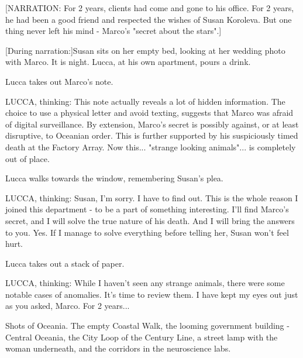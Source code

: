 \documentclass[11pt]{article}
\begin{document}
[NARRATION: For 2 years, clients had come and gone to his office. For 2 years, he had been a good friend and respected the wishes of Susan Koroleva. But one thing never left his mind - Marco's "secret about the stars".]

[During narration:]Susan sits on her empty bed, looking at her wedding photo with Marco. It is night. Lucca, at his own apartment, pours a drink.

Lucca takes out Marco's note.

LUCCA, thinking: 
This note actually reveals a lot of hidden information. 
The choice to use a physical letter and avoid texting, suggests that Marco was afraid of digital surveillance. 
By extension, Marco's secret is possibly against, or at least disruptive, to Oceanian order. 
This is further supported by his suspiciously timed death at the Factory Array.
Now this... "strange looking animals"... is completely out of place.

Lucca walks towards the window, remembering Susan's plea. 

LUCCA, thinking: Susan, I'm sorry. I have to find out. This is the whole reason I joined this department - to be a part of something interesting. I'll find Marco's secret, and I will solve the true nature of his death. And I will bring the answers to you. Yes. If I manage to solve everything before telling her, Susan won't feel hurt. 

Lucca takes out a stack of paper. 

LUCCA, thinking: 
While I haven't seen any strange animals, there were some notable cases of anomalies. It's time to review them.
I have kept my eyes out just as you asked, Marco.
For 2 years...



Shots of Oceania. 
The empty Coastal Walk, the looming government building - Central Oceania, the City Loop of the Century Line, a street lamp with the woman underneath, and the corridors in the neuroscience labs.
\end{document}
